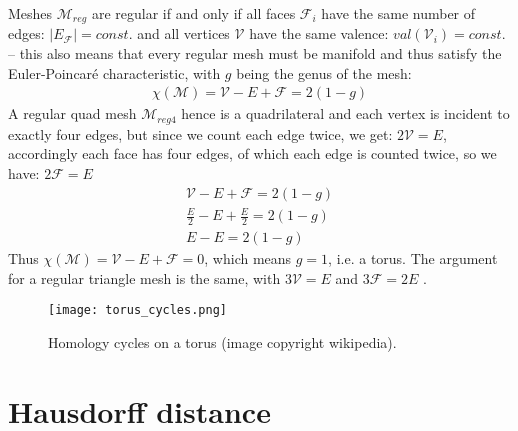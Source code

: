 Meshes $\mathcal{M}_{reg}$ are regular if and only if all faces $\mathcal{F}_{i}$ have the same number of edges: $|E_{\mathcal{F}}|=const.$ and all vertices $\mathcal{V}$ have the same valence: $val(\mathcal{V}_{i})=const.$ -- this also means that every regular mesh must be manifold and thus satisfy the Euler-Poincaré characteristic, with $g$ being the genus of the mesh:
\begin{eqnarray}
\chi(\mathcal{M})=\mathcal{V}-E+\mathcal{F}=2(1-g)
\end{eqnarray}
A regular quad mesh $\mathcal{M}_{reg4}$ hence is a quadrilateral and each vertex is incident to exactly four edges, but since we count each edge twice, we get: $2\mathcal{V}=E$, accordingly each face has four edges, of which each edge is counted twice, so we have: $2\mathcal{F}=E$
\begin{eqnarray}
\mathcal{V}-E+\mathcal{F}=2(1-g)\\
\frac{E}{2}-E+\frac{E}{2}=2(1-g)\\
E-E=2(1-g)
\end{eqnarray}
Thus $\chi(\mathcal{M})=\mathcal{V}-E+\mathcal{F}=0$, which means $g=1$, i.e. a torus.
The argument for a regular triangle mesh is the same, with $3\mathcal{V}=E$ and $3\mathcal{F}=2E$ \citep[cf.][]{Shene2005}.
\begin{figure}[ht]
\centering
\texttt{[image: torus\_cycles.png]}
\caption{Homology cycles on a torus (image copyright wikipedia).}
\label{fig:torus_cycles}
\end{figure}

\newpage
\vspace*{1ex}
\section{Hausdorff distance}
\label{appendix5}

